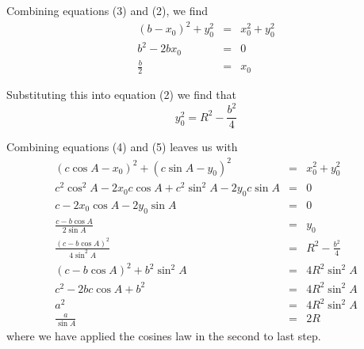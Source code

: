 \documentclass{article}
\begin{document}
Combining equations (3) and (2), we find
\begin{eqnarray*}
\left(b-x_0\right)^2 + y_0^2 &=& x_0^2 + y_0^2\\
b^2 - 2bx_0 &=& 0\\
\frac{b}{2} &=& x_0
\end{eqnarray*}

Substituting this into equation (2) we find that 
\begin{equation}
y_0^2 = R^2 - \frac{b^2}{4}\label{y_0}
\end{equation}

Combining equations (4) and (5) leaves us with
\begin{eqnarray*}
\left(c\cos A-x_0\right)^2 + \left(c \sin A - y_0\right)^2 &=& x_0^2 +
y_0^2\\
c^2\cos^2A-2x_0c\cos A + c^2\sin^2A-2y_0c\sin A &=& 0\\
c-2x_0\cos A - 2y_0 \sin A &=&0\\
\frac{c-b\cos A}{2\sin A} &=& y_0\\
\frac{\left(c-b\cos A\right)^2}{4\sin^2A} &=& R^2 - \frac{b^2}{4}\\
\left(c-b\cos A\right)^2 + b^2 \sin^2 A &=& 4R^2\sin^2 A\\
c^2 - 2bc\cos A +b^2 &=& 4R^2\sin^2A\\
a^2 &=& 4R^2\sin^2A\\
\frac{a}{\sin A} &=& 2R
\end{eqnarray*}
where we have applied the cosines law in the second to last step.
\end{document}
